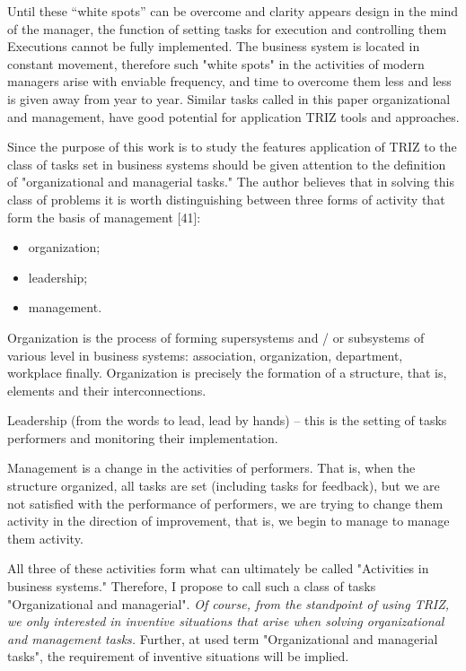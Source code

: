Until these “white spots” can be overcome and clarity appears design in the
mind of the manager, the function of setting tasks for execution and
controlling them Executions cannot be fully implemented. The business system
is located in constant movement, therefore such "white spots" in the
activities of modern managers arise with enviable frequency, and time to
overcome them less and less is given away from year to year. Similar tasks
called in this paper organizational and management, have good potential for
application TRIZ tools and approaches.

Since the purpose of this work is to study the features application of TRIZ to
the class of tasks set in business systems should be given attention to the
definition of "organizational and managerial tasks."  The author believes that
in solving this class of problems it is worth distinguishing between three
forms of activity that form the basis of management [41]:
\begin{itemize}
\item organization;
\item leadership;
\item management.
\end{itemize}

Organization is the process of forming supersystems and / or subsystems of
various level in business systems: association, organization, department,
workplace finally.  Organization is precisely the formation of a structure,
that is, elements and their interconnections.

Leadership (from the words to lead, lead by hands) -- this is the setting of
tasks performers and monitoring their implementation.

Management is a change in the activities of performers. That is, when the
structure organized, all tasks are set (including tasks for feedback), but we
are not satisfied with the performance of performers, we are trying to change
them activity in the direction of improvement, that is, we begin to manage to
manage them activity.

All three of these activities form what can ultimately be called "Activities
in business systems." Therefore, I propose to call such a class of tasks
"Organizational and managerial". \emph{Of course, from the standpoint of using
  TRIZ, we only interested in inventive situations that arise when solving
  organizational and management tasks.}  Further, at used term "Organizational
and managerial tasks", the requirement of inventive situations will be
implied.

